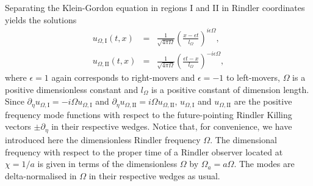 Separating the Klein-Gordon equation in regions I and II in Rindler coordinates yields the solutions
\begin{eqnarray}
u_{\Omega,\text{I}} (t,x) &=& \frac{1}{\sqrt{4\pi \Omega}}
{\left(\frac{x-\epsilon t}{l_{\Omega}}\right)}^{i\epsilon\Omega},\nonumber\\
u_{\Omega,\text{II}} (t,x) &=& \frac{1}{\sqrt{4\pi \Omega}}
{\left(\frac{\epsilon t - x}{l_{\Omega}}\right)}^{-i\epsilon\Omega}, 
\end{eqnarray}
where $\epsilon = 1$ again corresponds to right-movers and $\epsilon =
-1$ to left-movers, 
$\Omega$ is a positive dimensionless constant 
and $l_{\Omega}$ is a positive constant of dimension length. 
Since $\partial_\eta
u_{\Omega,\text{I}} = -i\Omega u_{\Omega,\text{I}}$ 
and 
$\partial_\eta 
u_{\Omega,\text{II}} = i\Omega u_{\Omega,\text{II}}$, 
$u_{\Omega,\text{I}}$ and $u_{\Omega,\text{II}}$ are the
positive frequency mode functions 
with respect to the future-pointing Rindler Killing
vectors $\pm \partial_\eta$ in their respective wedges. Notice that, for convenience, we have introduced here the dimensionless Rindler frequency $\Omega$. 
The dimensional frequency with respect to the
proper time of a Rindler observer located at $\chi = 1/a$ is given
in terms of the dimensionless $\Omega$ by $\Omega_a = a\Omega$. The modes are 
delta-normalised in $\Omega$ in their respective
wedges as usual. 



